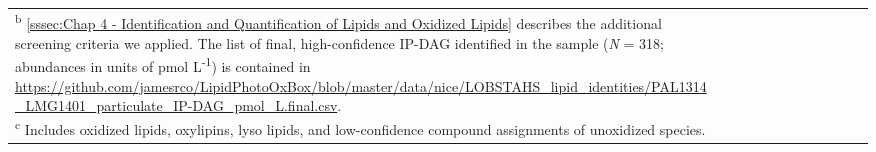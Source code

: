 \begin{footnotesize}
\begin{singlespace}
\begin{flushleft}
\begin{longtable}{ Lp{.01\linewidth} Lp{.01\linewidth} Lp{.53\linewidth} Lp{.1\linewidth} Lp{.1\linewidth} Lp{.1\linewidth} }
{\textsuperscript{b} \autoref{sssec:Chap 4 - Identification and Quantification of Lipids and Oxidized Lipids} describes the additional screening criteria we applied. The list of final, high-confidence IP-DAG identified in the sample (\emph{N} = 318; abundances in units of pmol L\textsuperscript{-1}) is contained in \url{https://github.com/jamesrco/LipidPhotoOxBox/blob/master/data/nice/LOBSTAHS_lipid_identities/PAL1314_LMG1401_particulate_IP-DAG_pmol_L.final.csv}.\\
\textsuperscript{c} Includes oxidized lipids, oxylipins, lyso lipids, and low-confidence compound assignments of unoxidized species.\\
}
\end{longtable}
\end{flushleft}
\end{singlespace}
\end{footnotesize}